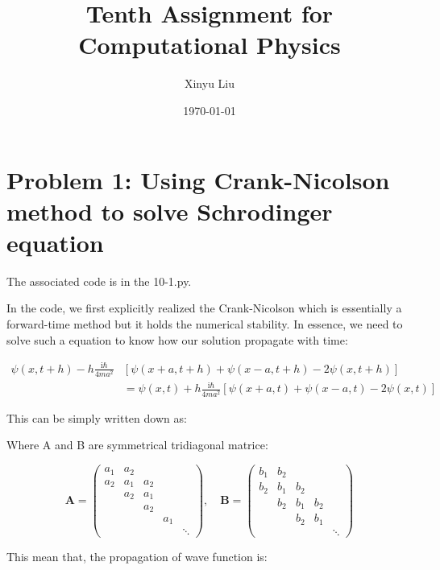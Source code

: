 \documentclass[letterpaper,12pt]{article}
\title{Tenth Assignment for Computational Physics}
\date{\today}
\author{Xinyu Liu}
\begin{document}
\maketitle
\tableofcontents

\section{Problem 1: Using Crank-Nicolson method to solve Schrodinger equation}

The associated code is in the 10-1.py.

In the code, we first explicitly realized the Crank-Nicolson which is essentially a forward-time method but it holds the numerical stability. In essence, we need to solve such a equation to know how our solution propagate with time:

\begin{align}
    \psi(x, t+h)-h \frac{\mathrm{i} \hbar}{4 m a^2} & {[\psi(x+a, t+h)+\psi(x-a, t+h)-2 \psi(x, t+h)] } \\
    & =\psi(x, t)+h \frac{\mathrm{i} \hbar}{4 m a^2}[\psi(x+a, t)+\psi(x-a, t)-2 \psi(x, t)]
\end{align}

This can be simply written down as:



Where A and B are symmetrical tridiagonal matrice:


\begin{equation}
    \mathbf{A}=\left(\begin{array}{llllll}
        a_1 & a_2 & & & \\
        a_2 & a_1 & a_2 & & \\
        & a_2 & a_1 & & \\
        & & a_2 & & \\
        & & & a_1 & \\
        & & & & \ddots
        \end{array}\right), \quad \mathbf{B}=\left(\begin{array}{lllll}
        b_1 & b_2 & & & \\
        b_2 & b_1 & b_2 & & \\
        & b_2 & b_1 & b_2 & \\
        & & b_2 & b_1 & \\
        & & & & \ddots
    \end{array}\right)
\end{equation}

This mean that, the propagation of wave function is:
\end{document}
